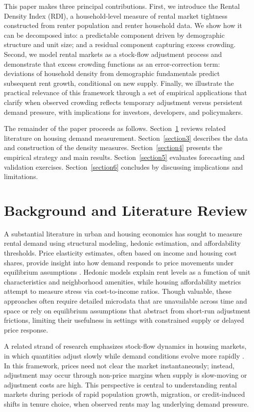 \documentclass[pdflatex,sn-basic]{sn-jnl}%
\theoremstyle{thmstyleone}%
\theoremstyle{thmstyletwo}%
\theoremstyle{thmstylethree}%
\begin{document}
This paper makes three principal contributions. First, we introduce the Rental Density Index (RDI), a household-level measure of rental market tightness constructed from renter population and renter household data. We show how it can be decomposed into: a predictable component driven by demographic structure and unit size; and a residual component capturing excess crowding. Second, we model rental markets as a stock-flow adjustment process and demonstrate that excess crowding functions as an error-correction term: deviations of household density from demographic fundamentals predict subsequent rent growth, conditional on new supply. Finally, we illustrate the practical relevance of this framework through a set of empirical applications that clarify when observed crowding reflects temporary adjustment versus persistent demand pressure, with implications for investors, developers, and policymakers.

The remainder of the paper proceeds as follows. Section~\ref{section2}  reviews related literature on housing demand measurement. Section~\ref{section3}  describes the data and construction of the density measures. Section~\ref{section4} presents the empirical strategy and main results. Section~\ref{section5} evaluates forecasting and validation exercises. Section~\ref{section6} concludes by discussing implications and limitations.

\section{Background and Literature Review}\label{section2}

A substantial literature in urban and housing economics has sought to measure rental
demand using structural modeling, hedonic estimation, and affordability thresholds.
Price elasticity estimates, often based on income and housing cost shares, provide
insight into how demand responds to price movements under equilibrium assumptions
\cite{green2002measuring, malpezzi1996rent}. Hedonic models explain rent levels as a
function of unit characteristics and neighborhood amenities, while housing affordability
metrics attempt to measure stress via cost-to-income ratios. Though valuable, these
approaches often require detailed microdata that are unavailable across time and space
or rely on equilibrium assumptions that abstract from short-run adjustment frictions,
limiting their usefulness in settings with constrained supply or delayed price response.

A related strand of research emphasizes stock-flow dynamics in housing markets, in
which quantities adjust slowly while demand conditions evolve more rapidly
\cite{wheaton1991realestate, goodman1992rental}. In this framework, prices need not
clear the market instantaneously; instead, adjustment may occur through non-price
margins when supply is slow-moving or adjustment costs are high. This perspective is
central to understanding rental markets during periods of rapid population growth,
migration, or credit-induced shifts in tenure choice, when observed rents may lag
underlying demand pressure.
\end{document}
